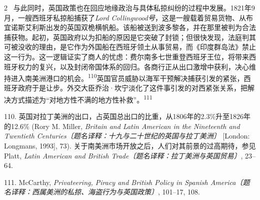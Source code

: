 \documentclass[10pt,a4paper]{article}
\begin{document}
\begin{paracol}{2}
\switchcolumn*
{\scriptsize\color{gray} [p. 24]}\ 与此同时，英国政策也在回应地缘政治与具体私掠纠纷的过程中发展。1821年9月，一艘西班牙私掠船捕获了\textit{Lord Collingwood号}，这是一艘载着贸易货物、从布宜诺斯艾利斯出发的英国双桅横帆船。该船被送到波多黎各，并在那里被判为合法捕获物。起初，英国政府以为扣船的原因是它突破了封锁；但很快发现，法庭判其可被没收的理由，是它作为外国船在西班牙领土从事贸易，而《印度群岛法》禁止这一行为。这一逻辑证实了商人的忧虑：费尔南多七世重登西班牙王位，将带来西班牙权力的复兴，以及封闭帝国体系的回归。各商行正从出口激增中获利，决心维持进入南美洲港口的机\mbox{会。\textsuperscript{110}}英国官员威胁以海军干预解决捕获引发的紧张，西班牙政府于是让步。外交大臣乔治·坎宁淡化了这件事引发的对西紧张关系，把解决方式描述为“对地方性不满的地方性补救”。\nobreak\textsuperscript{111}\par{\small 110. 英国对拉丁美洲的出口，占英国总出口的比重，从1806年的2.3\%升至1826年的12.6\% (Rory M. Miller, \textit{Britain and Latin American in the Nineteenth and Twentieth Centuries〔题名译释：十九与二十世纪的英国与拉丁美洲〕} [London: Longmans, 1993], 73). 关于南美洲市场开放之后，人们对其前景的过高期待，参见 Platt, \textit{Latin American and British Trade〔题名译释：拉丁美洲与英国贸易〕}, 23–64.\par}{\small 111. McCarthy, \textit{Privateering, Piracy and British Policy in Spanish America〔题名译释：西属美洲的私掠、海盗行为与英国政策〕}, 101–17, 108.\par}
\switchcolumn

\end{paracol}
\end{document}
